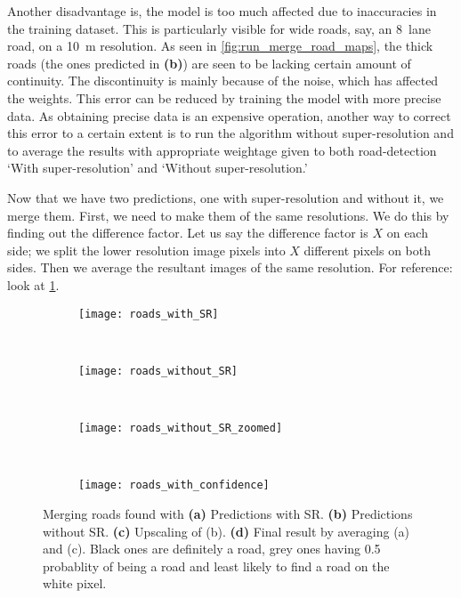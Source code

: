 Another disadvantage is, the model is too much affected due to inaccuracies in the training dataset. This is particularly visible for wide roads, say, an 8~lane road, on a 10~m resolution. As seen in \cref{fig:run_merge_road_maps}, the thick roads (the ones predicted in \textbf{(b)}) are seen to be lacking certain amount of continuity. The discontinuity is mainly because of the noise, which has affected the weights. This error can be reduced by training the model with more precise data. As obtaining precise data is an expensive operation, another way to correct this error to a certain extent is to run the algorithm without super-resolution and to average the results with appropriate weightage given to both road-detection `With super-resolution' and `Without super-resolution.'

Now that we have two predictions, one with super-resolution and without it, we merge them. First, we need to make them of the same resolutions. We do this by finding out the difference factor. Let us say the difference factor is $X$ on each side; we split the lower resolution image pixels into $X$ different pixels on both sides. Then we average the resultant images of the same resolution. For reference: look at \cref{fig:roads_in_confidence}.

\begin{figure}[h!]
  \begin{subfigure}[b]{0.25\textwidth}
    \texttt{[image: roads\_with\_SR]}
    \caption{}
  \end{subfigure}~
  \begin{subfigure}[b]{0.15\textwidth}
    \texttt{[image: roads\_without\_SR]}
    \caption{}
  \end{subfigure}~
  \begin{subfigure}[b]{0.25\textwidth}
    \texttt{[image: roads\_without\_SR\_zoomed]}
    \caption{}
  \end{subfigure}~
  \begin{subfigure}[b]{0.25\textwidth}
    \texttt{[image: roads\_with\_confidence]}
    \caption{}
  \end{subfigure}
  \caption[Finding likelihood of roads in predictions]{Merging roads found with \textbf{(a)} Predictions with SR. \textbf{(b)} Predictions without SR. \textbf{(c)} Upscaling of (b). \textbf{(d)} Final result by averaging (a) and (c). Black ones are definitely a road, grey ones having 0.5 probablity of being a road and least likely to find a road on the white pixel.}
  \label{fig:roads_in_confidence}
\end{figure}

